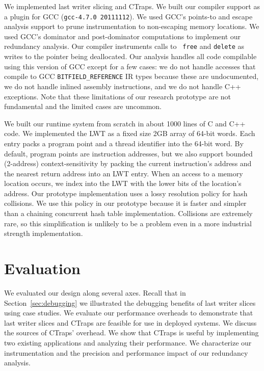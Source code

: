\documentclass[preprint,9pt]{sigplanconf}
\newcommand{\ctraps}{CTraps\xspace}
\begin{document}
We implemented last writer slicing and \ctraps.  We built our compiler support
as a plugin for GCC ({\tt gcc-4.7.0 20111112}).  We used GCC's points-to and
escape analysis support to prune instrumentation to non-escaping memory
locations.  We used GCC's dominator and post-dominator computations to
implement our redundancy analysis.  Our compiler instruments calls to {\tt
free} and {\tt delete} as writes to the pointer being deallocated.  Our
analysis handles all code compilable using this version of GCC except for a few
cases: we do not handle accesses that compile to GCC {\tt BITFIELD\_REFERENCE}
IR types because these are undocumented, we do not handle inlined assembly
instructions, and we do not handle C++ exceptions.  Note that these limitations
of our research prototype are not fundamental and the limited cases are
uncommon.   

We built our runtime system from scratch in about 1000 lines of C and C++ code.
We implemented the LWT as a fixed size 2GB array of 64-bit words.  Each entry
packs a program point and a thread identifier into the 64-bit word.  By
default, program points are instruction addresses, but we also support bounded
(2-address) context-sensitivity by packing the current instruction's address
and the nearest return address into an LWT entry. When an access to a memory
location occurs, we index into the LWT with the lower bits of the location's
address.  Our prototype implementation uses a lossy resolution policy for hash
collisions.  We use this policy in our prototype because it is faster and
simpler than a chaining concurrent hash table implementation.  Collisions are
extremely rare, so this simplification is unlikely to be a problem even in a
more industrial strength implementation.  




\section{Evaluation}
\label{sec:eval}
We evaluated our design along several axes. Recall that in
Section~\ref{sec:debugging} we illustrated the debugging benefits of last
writer slices using case studies.   We evaluate our performance overheads to
demonstrate that last writer slices and \ctraps are feasible for use in
deployed systems.  We discuss the sources of \ctraps' overhead.   We show that
\ctraps is useful by implementing two existing applications and analyzing their
performance.  We characterize our instrumentation and the precision and
performance impact of our redundancy analysis.  
\end{document}
